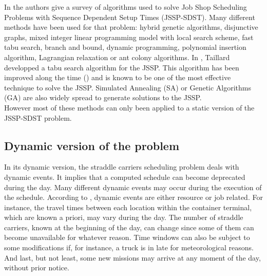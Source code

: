 \documentclass[a4paper,10pt]{article}
\begin{document}
In \cite{Allahverdi2008} the authors give a survey of algorithms used to solve Job Shop Scheduling Problems with Sequence Dependent Setup Times (JSSP-SDST). Many different methods have been used for that problem: hybrid genetic algorithms, disjunctive graphs, mixed integer linear programming model with local search scheme, fast tabu search, branch and bound, dynamic programming, polynomial insertion algorithm, Lagrangian relaxation or ant colony algorithms. In \cite{Taillard1994}, Taillard developped a tabu search algorithm for the JSSP. This algorithm has been improved along the time (\cite{Blazewicz1996, Watson2003}) and is known to be one of the most effective technique to solve the JSSP. Simulated Annealing (SA) or Genetic Algorithms (GA) are also widely spread to generate solutions to the JSSP.\\%

However most of these methods can only been applied to a static version of the JSSP-SDST problem.

\subsection{Dynamic version of the problem}\label{subsec:dynamic}

In its dynamic version, the straddle carriers scheduling problem deals with dynamic events. It implies that a computed schedule can become deprecated during the day. Many different dynamic events may occur during the execution of the schedule. According to \cite{Ouelhadj2009}, dynamic events are either resource or job related. For instance, the travel times between each location within the container terminal, which are known a priori, may vary during the day. The number of straddle carriers, known at the beginning of the day, can change since some of them can become unavailable for whatever reason. Time windows can also be subject to some modifications if, for instance, a truck is in late for meteorological reasons. And last, but not least, some new missions may arrive at any moment of the day, without prior notice.\\
\end{document}
